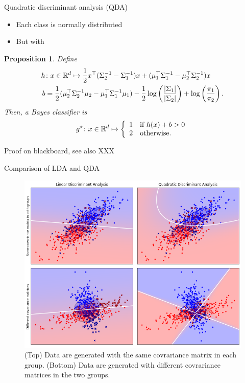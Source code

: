 \documentclass[xcolor={usenames,dvipsnames},handout]{beamer}
\newtheorem{prop}[theorem]{Proposition}
\begin{document}
\begin{frame}{Quadratic discriminant analysis (QDA)}
\begin{itemize}
\item Each class is normally distributed
\item But with 
\end{itemize}
		\begin{prop}
		Define
		\begin{align*}
			h &\colon x \in \mathbb{R}^d \mapsto \frac 12 x^\top (\Sigma_2^{-1}-\Sigma_1^{-1}) x + (\mu_1^\top\Sigma_1^{-1}-\mu_2^\top\Sigma_2^{-1})x \\
			b &= \frac 12 (\mu_2^\top\Sigma_2^{-1}\mu_2 - \mu_1^\top\Sigma_1^{-1}\mu_1) - \frac 12 \log \left( \frac{|\Sigma_1|}{|\Sigma_2|} \right) + \log \left( \frac{\pi_1}{\pi_2} \right).
		\end{align*}
		Then, a Bayes classifier is
		$$
			g^\star \colon x \in \mathbb{R}^d \mapsto
			\left\{ \begin{array}{ll}
				1 & \text{if } h(x) + b > 0 \\
				2 & \text{otherwise}.
			\end{array} \right.
		$$
	\end{prop}

		\centering
{\color{Vert} Proof on blackboard, see also XXX}

\end{frame}

\begin{frame}{Comparison of LDA and QDA}
	\begin{figure}[h]
		\center
		\includegraphics[height=0.75\textheight]{lda_plot}
		\caption{(Top) Data are generated with the same covrariance matrix in each group. (Bottom) Data are generated with different covrariance matrices in the two groups.}
		\label{fig:lda_qda}
	\end{figure}
\end{frame}
\end{document}
